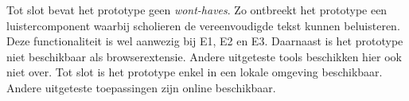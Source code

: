 \medspace

Tot slot bevat het prototype geen \textit{wont-haves}. Zo ontbreekt het prototype een luistercomponent waarbij scholieren de vereenvoudigde tekst kunnen beluisteren. Deze functionaliteit is wel aanwezig bij E1, E2 en E3. Daarnaast is het prototype niet beschikbaar als browserextensie. Andere uitgeteste tools beschikken hier ook niet over. Tot slot is het prototype enkel in een lokale omgeving beschikbaar. Andere uitgeteste toepassingen zijn online beschikbaar. 